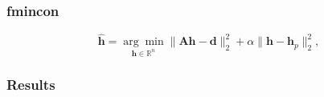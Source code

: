 \documentclass[7pt]{beamer}
\begin{document}
 \begin{frame}
\frametitle{fmincon}
$$
\mathbf{\hat{h}} = \underset{\mathbf{h} \in \mathbb{R}^n}{\arg \min} \|  \mathbf{A}\mathbf{h} -  \mathbf{d} \|_2^2  +  \alpha \| \mathbf{h} -  \mathbf{h}_p\|_2^2,
$$



\end{frame}





 \begin{frame}
\frametitle{Results}


\end{frame}





\end{document}
